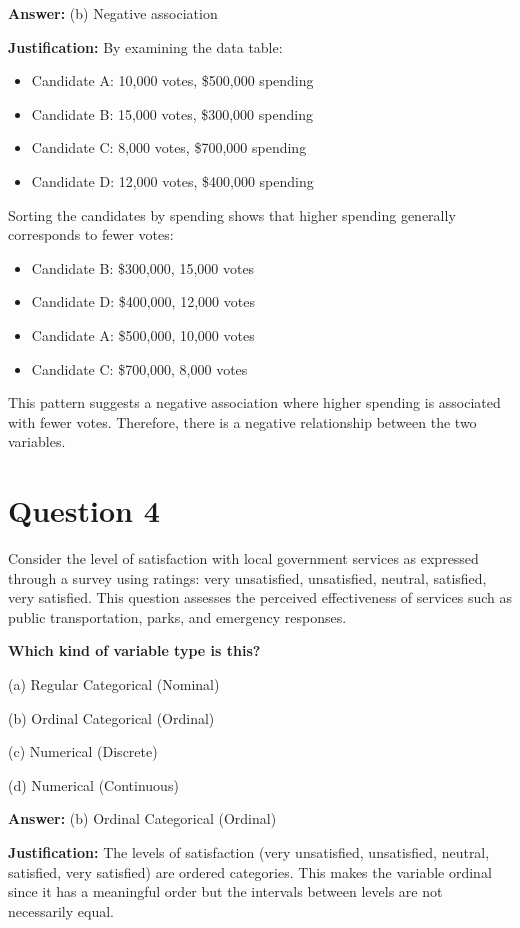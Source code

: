 \documentclass{article}
\begin{document}
\textbf{Answer:} (b) Negative association

\textbf{Justification:} By examining the data table:

\begin{itemize}
  \item Candidate A: 10,000 votes, \$500,000 spending
  \item Candidate B: 15,000 votes, \$300,000 spending
  \item Candidate C: 8,000 votes, \$700,000 spending
  \item Candidate D: 12,000 votes, \$400,000 spending
\end{itemize}

Sorting the candidates by spending shows that higher spending generally corresponds to fewer votes:
\begin{itemize}
  \item Candidate B: \$300,000, 15,000 votes
  \item Candidate D: \$400,000, 12,000 votes
  \item Candidate A: \$500,000, 10,000 votes
  \item Candidate C: \$700,000, 8,000 votes
\end{itemize}

This pattern suggests a negative association where higher spending is associated with fewer votes. Therefore, there is a negative relationship between the two variables.

\section*{Question 4}
Consider the level of satisfaction with local government services as expressed through a survey using ratings: very unsatisfied, unsatisfied, neutral, satisfied, very satisfied. This question assesses the perceived effectiveness of services such as public transportation, parks, and emergency responses.

\textbf{Which kind of variable type is this?}

(a) Regular Categorical (Nominal)

(b) Ordinal Categorical (Ordinal)

(c) Numerical (Discrete)

(d) Numerical (Continuous)

\textbf{Answer:} (b) Ordinal Categorical (Ordinal)

\textbf{Justification:} The levels of satisfaction (very unsatisfied, unsatisfied, neutral, satisfied, very satisfied) are ordered categories. This makes the variable ordinal since it has a meaningful order but the intervals between levels are not necessarily equal.
\end{document}
